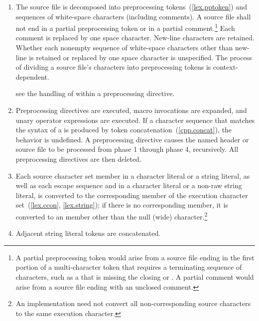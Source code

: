\begin{enumerate}
\item The source file is decomposed into preprocessing
tokens~(\ref{lex.pptoken}) and sequences of white-space characters
(including comments). A source file shall not end in a partial
preprocessing token or in a partial comment.\footnote{A partial preprocessing
token would arise from a source file
ending in the first portion of a multi-character token that requires a
terminating sequence of characters, such as a 
that is missing the closing 
or \tcode{>}. A partial comment
would arise from a source file ending with an unclosed \tcode{/*}
comment.}
Each comment is replaced by one space character. New-line characters are
retained. Whether each nonempty sequence of white-space characters other
than new-line is retained or replaced by one space character is
unspecified. The process of dividing a source file's
characters into preprocessing tokens is context-dependent.
\begin{example}
see the handling of \tcode{<} within a  preprocessing
directive.
\end{example}

\item Preprocessing directives are executed, macro invocations are
expanded, and  unary operator expressions are executed.
If a character sequence that matches the syntax of a
 is produced by token
concatenation~(\ref{cpp.concat}), the behavior is undefined. A
 preprocessing directive causes the named header or
source file to be processed from phase 1 through phase 4, recursively.
All preprocessing directives are then deleted.

\item Each source character set member in a character literal or a string
literal, as well as each escape sequence and  in a
character literal or a non-raw string literal, is converted to the corresponding
member of the execution character set~(\ref{lex.ccon}, \ref{lex.string}); if
there is no corresponding member, it is converted to an  member other
than the null (wide) character.\footnote{An implementation need not convert all
non-corresponding source characters to the same execution character.}

\item Adjacent string literal tokens are concatenated.


\end{enumerate}
